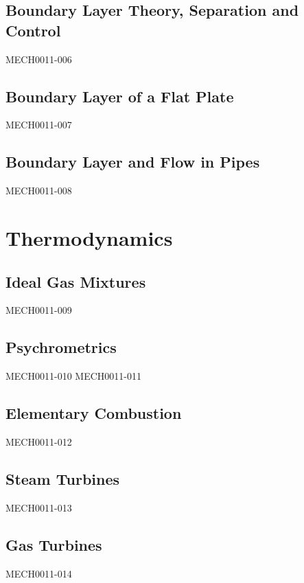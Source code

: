 \documentclass[12pt]{report}
\numberwithin{equation}{section}
\begin{document}
\chapter{Boundary Layer Theory, Separation and Control}
{MECH0011-006}
\chapter{Boundary Layer of a Flat Plate}
{MECH0011-007}
\chapter{Boundary Layer and Flow in Pipes}
{MECH0011-008}


\part{Thermodynamics}
\chapter{Ideal Gas Mixtures}
{MECH0011-009}
\chapter{Psychrometrics}
{MECH0011-010}
{MECH0011-011}
\chapter{Elementary Combustion}
{MECH0011-012}
\chapter{Steam Turbines}
{MECH0011-013}
\chapter{Gas Turbines}
{MECH0011-014}
\end{document}
